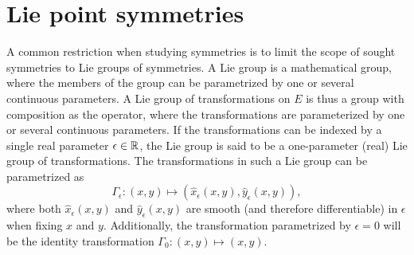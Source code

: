 \section{Lie point symmetries}

A common restriction when studying symmetries is to limit the scope of sought symmetries to Lie groups of symmetries.
A Lie group is a mathematical group, where the members of the group can be parametrized by one or several continuous parameters. %
A Lie group of transformations on \(E\) is thus a group with composition as the operator, where the transformations are parameterized by one or several continuous parameters.
If the transformations can be indexed by a single real parameter \(\epsilon \in \mathbb{R}\), the Lie group is said to be a one-parameter (real) Lie group of transformations.
The transformations in such a Lie group can be parametrized as
\begin{equation*} %
  \Gamma_\epsilon: \left(x,y\right) \mapsto \left(\hat{x}_\epsilon(x,y), \hat{y}_\epsilon(x,y)\right),
\end{equation*}
where both \(\hat{x}_\epsilon(x,y)\) and \(\hat{y}_\epsilon(x,y)\) are smooth (and therefore differentiable) in \(\epsilon\) when fixing \(x\) and \(y\).
Additionally, the transformation parametrized by \(\epsilon = 0\) will be the identity transformation \(\Gamma_0: \left(x,y\right) \mapsto \left(x,y\right)\).

